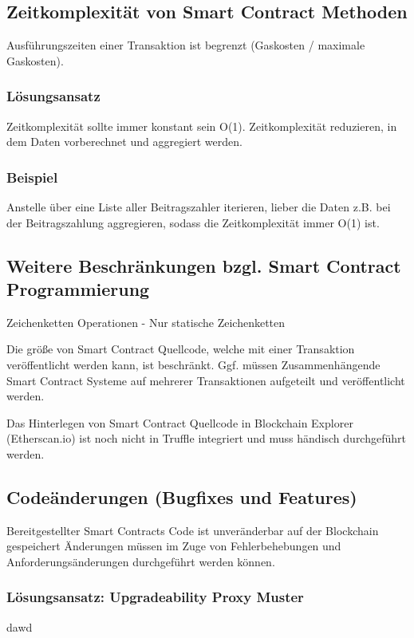\subsection{Zeitkomplexität von Smart Contract Methoden}
Ausführungszeiten einer Transaktion ist begrenzt (Gaskosten / maximale Gaskosten).

\subsubsection*{Lösungsansatz}
Zeitkomplexität sollte immer konstant sein O(1). Zeitkomplexität reduzieren, in dem Daten vorberechnet und aggregiert werden.

\subsubsection*{Beispiel} Anstelle über eine Liste aller Beitragszahler iterieren, lieber die Daten z.B. bei der Beitragszahlung aggregieren, sodass die Zeitkomplexität immer O(1) ist.


\subsection{Weitere Beschränkungen bzgl. Smart Contract Programmierung}

\begin{compactitem}
\item Zeichenketten Operationen -  Nur statische Zeichenketten
\item Die größe von Smart Contract Quellcode, welche mit einer Transaktion veröffentlicht werden kann, ist beschränkt. Ggf. müssen Zusammenhängende Smart Contract Systeme auf mehrerer Transaktionen aufgeteilt und veröffentlicht werden.
\item Das Hinterlegen von Smart Contract Quellcode in  Blockchain Explorer (Etherscan.io) ist noch nicht in Truffle integriert und muss händisch durchgeführt werden.
\end{compactitem}


\subsection*{Codeänderungen (Bugfixes und Features)}
Bereitgestellter Smart Contracts Code ist unveränderbar auf der Blockchain gespeichert
Änderungen müssen im Zuge von Fehlerbehebungen und Anforderungsänderungen durchgeführt werden können.

\subsubsection*{Lösungsansatz: Upgradeability Proxy Muster}
dawd

